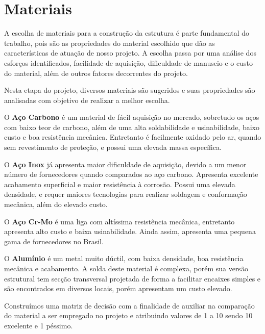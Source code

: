 	\section{Materiais}
	
	A escolha de materiais para a construção da estrutura é parte fundamental do trabalho, pois são as propriedades do material escolhido que dão as características de atuação de nosso projeto. A escolha passa por uma análise dos esforços identificados, facilidade de aquisição, dificuldade de manuseio e o custo do material, além de outros fatores decorrentes do projeto.
	
	Nesta etapa do projeto, diversos materiais são sugeridos e suas propriedades são analisadas com objetivo de realizar a melhor escolha.
	
	
	O \textbf{Aço Carbono} é um material de fácil aquisição no mercado, sobretudo os aços com baixo teor de carbono, além de uma alta soldabilidade e usinabilidade, baixo custo e boa resistência mecânica. Entretanto é facilmente oxidado pelo ar, quando sem revestimento de proteção, e possui uma elevada massa específica.
	
	O \textbf{Aço Inox} já apresenta maior dificuldade de aquisição, devido a um menor número de fornecedores quando comparados ao aço carbono. Apresenta excelente acabamento superficial e maior resistência à corrosão. Possui uma elevada densidade, e requer maiores tecnologias para realizar soldagem e conformação mecânica, além do elevado custo.
	
	O \textbf{Aço Cr-Mo} é uma liga com altíssima resistência mecânica, entretanto apresenta alto custo e baixa usinabilidade. Ainda assim, apresenta uma pequena gama de fornecedores no Brasil.
	
	O \textbf{Alumínio} é um metal muito dúctil, com baixa densidade, boa resistência mecânica e acabamento. A solda deste material é complexa, porém sua versão estrutural tem secção transversal projetada de forma a facilitar encaixes simples e  são encontrados em diversos locais, porém apresentam um custo elevado.\cite{callister}
	
	Construímos uma matriz de decisão com a finalidade de auxiliar na comparação do material a ser empregado no projeto e atribuindo valores de 1 a 10 sendo 10 excelente e 1 péssimo. 
	
